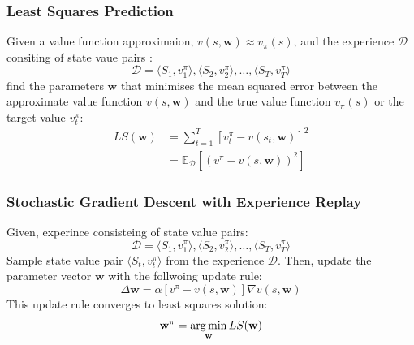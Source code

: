 \subsubsection{Least Squares Prediction}
Given a value function approximaion, \(v(s,\mathbf{w}) \approx v_{\pi}(s)\), and the experience \(\mathcal{D}\)
consiting of state vaue pairs :
\[
    \mathcal{D} =  \langle S_1,v_1^{\pi} \rangle, \langle S_2,v_2^{\pi} \rangle, \dots, \langle S_T,v_T^{\pi} \rangle 
\] 
find the parameters \(\mathbf{w}\) that minimises the mean squared error between the approximate value function
\(v(s,\mathbf{w})\) and the true value function \(v_{\pi}(s)\) or the target value \(v_t^{\pi}\):
\[
    \begin{aligned}
        LS(\mathbf{w}) &= \sum_{t=1}^{T} \left[ 
            v_t^{\pi} - v(s_t,\mathbf{w})
         \right]^2 \\
         &= \mathbb{E}_{\mathcal{D}} \left[ 
            \left( 
                v^{\pi} - v(s,\mathbf{w})
             \right)^2
          \right]
    \end{aligned}
\]

\subsubsection{Stochastic Gradient Descent with Experience Replay}
Given, experince consisteing of state value pairs:
\[
    \mathcal{D} =  \langle S_1,v_1^{\pi} \rangle, \langle S_2,v_2^{\pi} \rangle, \dots, \langle S_T,v_T^{\pi} \rangle
\]
Sample state value pair \(\langle S_t,v_t^{\pi} \rangle\) from the experience \(\mathcal{D}\). Then, update the
parameter vector \(\mathbf{w}\) with the follwoing update rule:
\[
    \Delta \mathbf{w} = \alpha \left[ 
        v^{\pi} - v(s,\mathbf{w})
     \right] \nabla v(s,\mathbf{w})  
\]
This update rule converges to least squares solution:
\[
    \mathbf{w}^{\pi} = \operatorname*{arg\,min}_{\mathbf{w}} LS(\mathbf{w})  
\]


